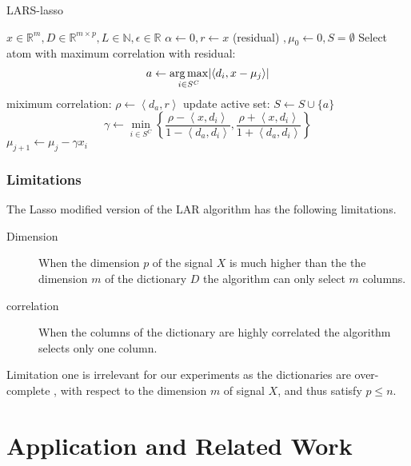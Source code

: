 \begin{algorithm}
\caption{LARS-lasso}
\begin{algorithmic}[1]
\REQUIRE $x \in \mathbb{R}^m, D \in \mathbb{R}^{m\times p}, L \in \mathbb{N}, \epsilon \in \mathbb{R}$
\STATE $\alpha \gets 0, r \gets x $ (residual) $, \mu_{0} \gets 0, S=\emptyset$
\STATE Select atom with maximum correlation with residual: 
\begin{equation*}
a \gets \operatorname*{arg\,max}_{i \in S^C} \lvert \left<d_i,x-\mu_{j}\right>  \rvert 
\end{equation*}
\STATE miximum correlation: $\rho \gets \left<d_a,r\right> $
\STATE update active set: $S \gets S \cup \{a\} $
\STATE 
\begin{equation*}
\gamma \gets \min_{i\in S^C} \left\lbrace \frac{\rho-\left< x,d_i \right> }{1-\left< d_a,d_i \right> }, \frac{\rho+\left< x,d_i \right> }{1+\left< d_a,d_i \right> } \right\rbrace
\end{equation*}
\STATE $ \mu_{j+1} \gets \mu_{j} - \gamma x_i $

\ENDFOR

\end{algorithmic}
\end{algorithm}

\subsubsection*{Limitations}
The Lasso modified version of the LAR algorithm has the following limitations.
\begin{description}
 \item[Dimension] When the dimension $p$ of the signal $X$ is 
much higher than the the dimension $m$ of the dictionary $D$ the algorithm can only select $m$ columns.

\item[correlation] When the columns of the dictionary are highly correlated the algorithm
selects only one column.
\end{description}

Limitation one is irrelevant for our experiments as the dictionaries are over-complete 
, with respect to the dimension $m$ of signal $X$, and thus satisfy $p\leq n$.

\section{Application and Related Work}

